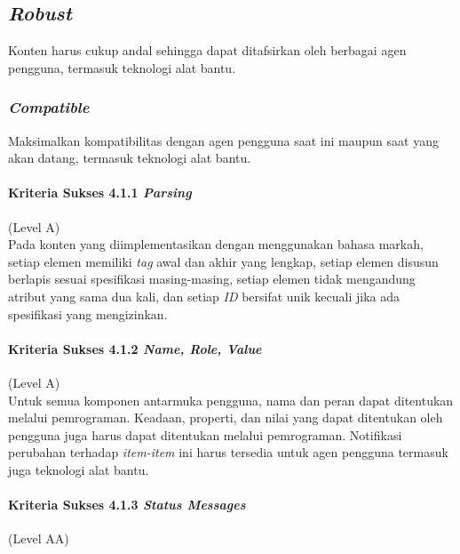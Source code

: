 
\subsection{\textit{Robust}}
\label{sec:robust}
Konten harus cukup andal sehingga dapat ditafsirkan oleh berbagai agen pengguna, termasuk teknologi alat bantu.

\subsubsection{\textit{Compatible}}
\label{sec:compatible}
Maksimalkan kompatibilitas dengan agen pengguna saat ini maupun saat yang akan datang, termasuk teknologi alat bantu.

\paragraph{Kriteria Sukses 4.1.1 \textit{Parsing}}
\label{sec:kriteria_sukses_4.1.1}
(Level A)\\

Pada konten yang diimplementasikan dengan menggunakan bahasa markah, setiap elemen memiliki \textit{tag} awal dan akhir yang lengkap, setiap elemen disusun berlapis sesuai spesifikasi masing-masing, setiap elemen tidak mengandung atribut yang sama dua kali, dan setiap \textit{ID} bersifat unik kecuali jika ada spesifikasi yang mengizinkan.

\paragraph{Kriteria Sukses 4.1.2 \textit{Name, Role, Value}}
\label{sec:kriteria_sukses_4.1.2}
(Level A)\\

Untuk semua komponen antarmuka pengguna, nama dan peran dapat ditentukan melalui pemrograman. Keadaan, properti, dan nilai yang dapat ditentukan oleh pengguna juga harus dapat ditentukan melalui pemrograman. Notifikasi perubahan terhadap \textit{item-item} ini harus tersedia untuk agen pengguna termasuk juga teknologi alat bantu.

\paragraph{Kriteria Sukses 4.1.3 \textit{Status Messages}}
\label{sec:kriteria_sukses_4.1.3}
(Level AA)\\

